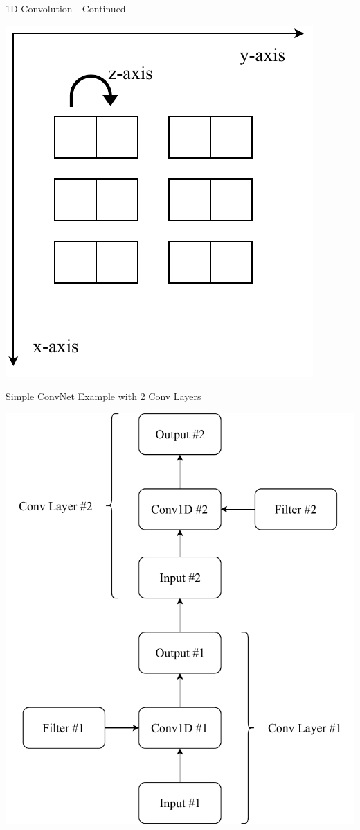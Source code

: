 \documentclass{beamer}
\begin{document}
		\begin{frame}{1D Convolution - Continued}
			\begin{center}
				\includegraphics[height=0.9\textheight]{numpy-3Dtensor-axis}
			\end{center}
		\end{frame}
		\begin{frame}{Simple ConvNet Example with 2 Conv Layers}
			\begin{center}
				\includegraphics[height=0.9\textheight]{convLayerExample}
			\end{center}
		\end{frame}
\end{document}
